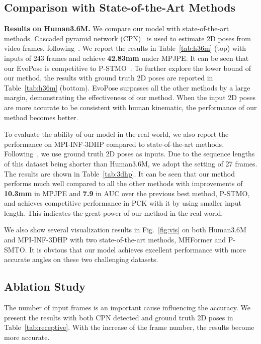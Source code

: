 \documentclass{article}
\begin{document}
\subsection{ Comparison with State-of-the-Art Methods}{\bf Results on Human3.6M.}
We compare our model with state-of-the-art methods. Cascaded pyramid network (CPN)~\cite{chen2018cascaded} is used to estimate 2D poses from video frames, following~\cite{zheng20213d,li2022mhformer,shan2022p,pavllo20193d}. We report the results in Table~\ref{tab:h36m} (top) with inputs of 243 frames and achieve {\bf 42.83mm} under MPJPE. It can be seen that our EvoPose is competitive to P-STMO~\cite{shan2022p}. To further explore the lower bound of our method, the results with ground truth 2D poses are reported in Table~\ref{tab:h36m} (bottom). EvoPose surpasses all the other methods by a large margin, demonstrating the effectiveness of our method. When the input 2D poses are more accurate to be consistent with human kinematic, the performance of our method becomes better.


To evaluate the ability of our model in the real world, we also report the performance on MPI-INF-3DHP compared to state-of-the-art methods. Following~\cite{chen2021anatomy,li2022mhformer,shan2022p}, we use ground truth 2D poses as inputs. Due to the sequence lengths of this dataset being shorter than Human3.6M, we adopt the setting of 27 frames. The results are shown in Table~\ref{tab:3dhp}. It can be seen that our method performs much well compared to all the other methods with improvements of {\bf 10.3mm} in MPJPE and {\bf 7.9} in AUC over the previous best method, P-STMO, and achieves competitive performance in PCK with it by using smaller input length. This indicates the great power of our method in the real world.

We also show several visualization results in Fig.~\ref{fig:vis} on both Human3.6M and MPI-INF-3DHP with two state-of-the-art methods, MHFormer and P-SMTO. It is obvious that our model achieves excellent performance with more accurate angles on these two challenging datasets.\vspace{-0.3em}

\subsection{Ablation Study}\vspace{-0.3em}
The number of input frames is an important cause influencing the accuracy. We present the results with both CPN detected and ground truth 2D poses in Table~\ref{tab:receptive}. With the increase of the frame number, the results become more accurate.
\end{document}
